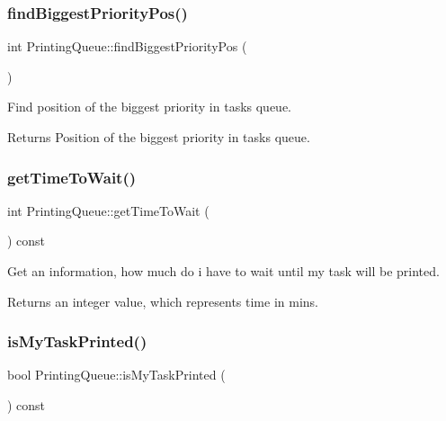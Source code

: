 \subsubsection{\texorpdfstring{find\+Biggest\+Priority\+Pos()}{findBiggestPriorityPos()}}
{\footnotesize\ttfamily int Printing\+Queue\+::find\+Biggest\+Priority\+Pos (\begin{DoxyParamCaption}{ }\end{DoxyParamCaption})}



Find position of the biggest priority in tasks queue. 

\begin{DoxyReturn}{Returns}
Position of the biggest priority in tasks queue. 
\end{DoxyReturn}
\mbox{\label{class_printing_queue_ad677a39d56b5ee403e88f4e32da606e4}} 
\subsubsection{\texorpdfstring{get\+Time\+To\+Wait()}{getTimeToWait()}}
{\footnotesize\ttfamily int Printing\+Queue\+::get\+Time\+To\+Wait (\begin{DoxyParamCaption}{ }\end{DoxyParamCaption}) const}



Get an information, how much do i have to wait until my task will be printed. 

\begin{DoxyReturn}{Returns}
an integer value, which represents time in mins. 
\end{DoxyReturn}
\mbox{\label{class_printing_queue_aa0081c56e8ff9fc7acbc8eb0c552f61c}} 
\subsubsection{\texorpdfstring{is\+My\+Task\+Printed()}{isMyTaskPrinted()}}
{\footnotesize\ttfamily bool Printing\+Queue\+::is\+My\+Task\+Printed (\begin{DoxyParamCaption}{ }\end{DoxyParamCaption}) const}



